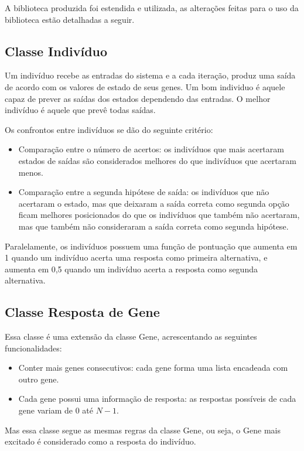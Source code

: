 A biblioteca produzida foi estendida e utilizada, as alterações feitas para o uso da biblioteca estão detalhadas a seguir.

\subsection{Classe Indivíduo}

Um indivíduo recebe as entradas do sistema e a cada iteração, produz uma saída de acordo com os valores de estado de seus genes. Um bom individuo é aquele capaz de prever as saídas dos estados dependendo das entradas. O melhor indivíduo é aquele que prevê todas saídas.

Os confrontos entre indivíduos se dão do seguinte critério:
\begin{itemize}
    \item Comparação entre o número de acertos: os indivíduos que mais acertaram estados de saídas são considerados melhores do que indivíduos que acertaram menos.
    \item Comparação entre a segunda hipótese de saída: os indivíduos que não acertaram o estado, mas que deixaram a saída correta como segunda opção ficam melhores posicionados do que os indivíduos que também não acertaram, mas que também não consideraram a saída correta como segunda hipótese.
\end{itemize}

Paralelamente, os indivíduos possuem uma função de pontuação que aumenta em 1 quando um indivíduo acerta uma resposta como primeira alternativa, e aumenta em 0,5 quando um indivíduo acerta a resposta como segunda alternativa.

\subsection{Classe Resposta de Gene}

Essa classe é uma extensão da classe Gene, acrescentando as seguintes funcionalidades:
\begin{itemize}
    \item Conter mais genes consecutivos: cada gene forma uma lista encadeada com outro gene.
    \item Cada gene possui uma informação de resposta: as respostas possíveis de cada gene variam de 0 até $N-1$.
\end{itemize}

Mas essa classe segue as mesmas regras da classe Gene, ou seja, o Gene mais excitado é considerado como a resposta do indivíduo.

